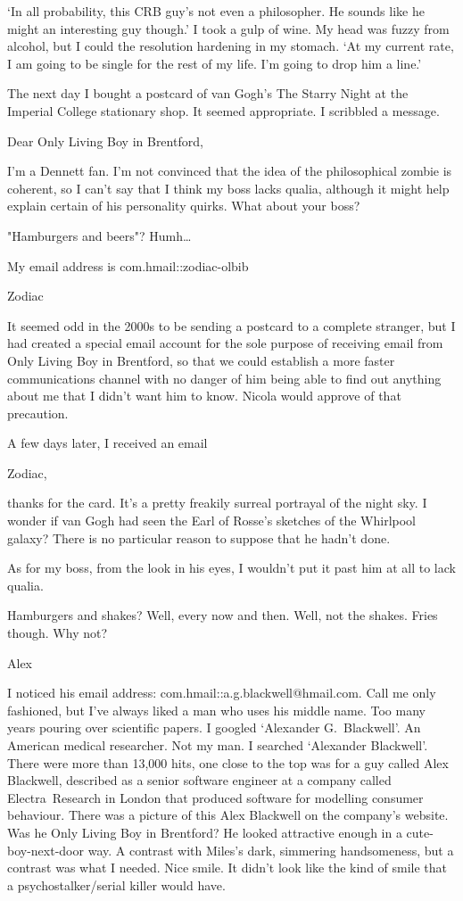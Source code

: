 `In all probability, this {\twelvesl CRB\/} guy's not even a philosopher. He sounds like he
might an interesting guy though.' I took a gulp of wine. My head was
fuzzy from alcohol, but I could the resolution hardening in my
stomach. `At my current rate, I am going to be single for the rest of my
life. I'm going to drop him a line.'

The next day I bought a postcard of van Gogh's {\twelvesl The Starry
Night\/} at the Imperial College stationary shop. It seemed
appropriate. I scribbled a message.

\startpostcard
Dear Only Living Boy in Brentford,

I'm a Dennett fan. I'm not convinced that the idea of the
philosophical zombie is coherent, so I can't say that I think my
boss lacks qualia, although it might help explain certain of his
personality quirks. What about your boss?

"Hamburgers and beers"? Humh\dots

My email address is com.hmail::zodiac-olbib

Zodiac
\stoppostcard

It seemed odd in the 2000s to be sending a postcard to a complete
stranger, but I had created a special email account for the sole
purpose of receiving email from Only Living Boy in Brentford, so
that we could establish a more faster communications channel with no
danger of him being able to find out anything about me that I didn't
want him to know. Nicola would approve of that precaution.

A few days later, I received an email

\startmessage
Zodiac,

thanks for the card. It's a pretty freakily surreal portrayal of the
night sky. I wonder if van Gogh had seen the Earl of Rosse's
sketches of the Whirlpool galaxy? There is no particular reason to
suppose that he hadn't done.

As for my boss, from the look in his eyes, I wouldn't put it past
him at all to lack qualia.

Hamburgers and shakes? Well, every now and then. Well, not the shakes. Fries though. Why not?

Alex
\stopmessage

I noticed his email address: {\twelvess com.hmail::a.g.blackwell@hmail.com}.
Call me only fashioned, but I've always liked a man who uses his
middle name. Too many years pouring over scientific papers. I
googled `Alexander G.~Blackwell'. An American medical researcher.
Not my man. I searched `Alexander Blackwell'. There were more than
13,000 hits, one close to the top was for a guy called Alex
Blackwell, described as a senior software engineer at a company
called Electra~Research in London that produced software for
modelling consumer behaviour. There was a picture of this Alex
Blackwell on the company's website. Was he Only Living Boy in
Brentford? He looked attractive enough in a cute-boy-next-door way.
A contrast with Miles's dark, simmering handsomeness, but a contrast
was what I needed. Nice smile. It didn't look like the kind of smile
that a psychostalker/serial killer would have.

